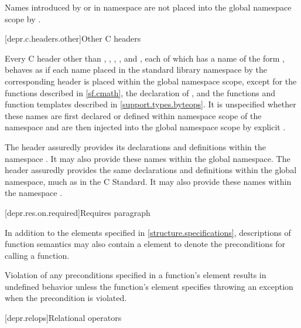 \pnum
\begin{note}
Names introduced by  or 
in namespace 
are not placed into the global namespace scope by .
\end{note}

[depr.c.headers.other]{Other C headers}

\pnum
Every C header
other than
,
,
,
, and
,
each of
which has a name of the form
%
,
behaves as if each name placed in the standard library namespace by
the corresponding
header is placed within
the global namespace scope,
except for the functions described in \ref{sf.cmath},
the declaration of , and
the functions and function templates described in \ref{support.types.byteops}.
It is unspecified whether these names are first declared or defined within
namespace scope of the namespace
 and are then injected into the global namespace scope by
explicit .

\pnum
\begin{example}
The header  assuredly
provides its declarations and definitions within the namespace
. It may also provide these names within the
global namespace.
The header 
assuredly provides the same declarations and definitions within
the global namespace,
much as in the C Standard. It may also provide these names within
the namespace .
\end{example}

[depr.res.on.required]{Requires paragraph}

\pnum
In addition to the elements specified in \ref{structure.specifications},
descriptions of function semantics may also contain a \requires element
to denote the preconditions for calling a function.

\pnum
{}%
Violation of any preconditions specified in a function's \requires element
results in undefined behavior
unless the function's \throws element
specifies throwing an exception when the precondition is violated.

%
[depr.relops]{Relational operators}

